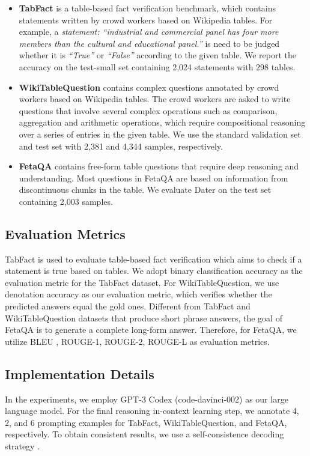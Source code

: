 \begin{itemize}
    \item \textbf{TabFact} is a table-based fact verification benchmark, which contains statements written by crowd workers based on Wikipedia tables. For example, a \textit{statement: ``industrial and commercial panel has four more members than the cultural and educational panel.''} is need to be judged whether it is \textit{``True''} or \textit{``False''} according to the given table.
    We report the accuracy on the test-small set containing 2,024 statements with 298 tables.
    \item \textbf{WikiTableQuestion} contains complex questions annotated by crowd workers based on Wikipedia tables. The crowd workers are asked to write questions that involve several complex operations such as comparison, aggregation and arithmetic operations, which require compositional reasoning over a series of entries in the given table. 
    We use the standard validation set and test set with 2,381 and 4,344 samples, respectively.
    \item \textbf{FetaQA} contains free-form table questions that require deep reasoning and understanding. Most questions in FetaQA are based on information from discontinuous chunks in the table. 
    We evaluate Dater on the test set containing 2,003 samples. 
\end{itemize}

\subsection{Evaluation Metrics}
TabFact is used to evaluate table-based fact verification which aims to check if a statement is true based on tables. We adopt binary classification accuracy as the evaluation metric for the TabFact dataset. For WikiTableQuestion, we use denotation accuracy as our evaluation metric, which verifies whether the predicted answers equal the gold ones. Different from TabFact and WikiTableQuestion datasets that produce short phrase answers, the goal of FetaQA is to generate a complete long-form answer. Therefore, for FetaQA, we utilize BLEU \citep{bleu}, ROUGE-1, ROUGE-2, ROUGE-L \citep{rouge} as evaluation metrics.

\subsection{Implementation Details}
In the experiments, we employ GPT-3 Codex (code-davinci-002) as our large language model.  
For the final reasoning in-context learning step, we annotate 4, 2, and 6 prompting examples for TabFact, WikiTableQuestion, and FetaQA, respectively. 
To obtain consistent results, we use a self-consistence decoding strategy \citep{cotsc}. 

